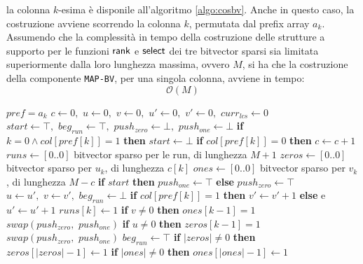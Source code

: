la colonna $k$-esima è disponile all'algoritmo \ref{algo:cosbv}. Anche in questo
caso, la costruzione avviene scorrendo la colonna $k$, permutata dal
prefix array $a_k$. \\ 
Assumendo che la complessità in tempo della costruzione delle
strutture a supporto per le funzioni $\mbox{\rm {\sf rank}}$ e $\mbox{\rm {\sf select}}$ dei tre
bitvector sparsi sia limitata superiormente dalla loro lunghezza massima, ovvero
$M$, si ha che la costruzione della componente \texttt{MAP-BV}, per una singola
colonna, avviene in tempo:
\begin{equation}
  \label{eq:bvcos}
  \mathcal{O}(M)
\end{equation}
\begin{algorithm}
  \small
  \begin{algorithmic}[1]
    \Comment $pref=a_k$
    \State $c\gets 0,\,\,u\gets 0,\,\,v\gets 0,\,\,u'\gets 0,\,\, v'\gets
    0,\,\,curr_{lcs}\gets 0$
    \State $start \gets \top,\,\,beg_{run}\gets \top,\,\,push_{zero}\gets
    \bot,\,\,push_{one}\gets \bot$
    \For {\textit{every} $k\in\left[0,\,\, M\right)$}
    \State \textbf{if} $k=0\land col[pref[k]]=1$ \textbf{then} $start \gets
    \bot$  
    \State \textbf{if} $col[pref[k]]=0$ \textbf{then}  $c\gets c+1$
    \EndFor
    \State $runs\gets[0..0]$
    \Comment bitvector sparso per le run, di lunghezza $M+1$
    \State $zeros\gets[0..0]$
    \Comment bitvector sparso per $u_k$, di lunghezza $c[k]$
    \State $ones\gets[0..0]$
    \Comment bitvector sparso per $v_k$, di lunghezza $M-c$
    \State \textbf{if} $start$ \textbf{then} $push_{one}\gets \top$
    \textbf{else} $push_{zero}\gets \top$ 
    \For {\textit{every} $k\in\left[0,\,\, M\right)$}
    \State $u\gets u',\,\,v\gets v',\,\,beg_{run}\gets \bot$
    \EndIf
    \State \textbf{if} $col[pref[k]]=1$ \textbf{then} $v'\gets v'+1$
    \textbf{else} e $u'\gets u'+1$   
    \State $runs[k]\gets 1$
    \State \textbf{if} $v\neq 0$ \textbf{then} $ones[k-1]=1$
    \State $swap(push_{zero},\,\,push_{one})$
    \Else
    \State \textbf{if} $u\neq 0$ \textbf{then} $zeros[k-1]=1$
    \State $swap(push_{zero},\,\,push_{one})$
    \EndIf
    \State $beg_{run}\gets \top$
    \EndIf
    \EndFor
    \State \textbf{if} $|zeros|\neq 0$ \textbf{then} $zeros[|zeros|-1]\gets 1$
    \State \textbf{if} $|ones|\neq 0$ \textbf{then} $ones[|ones|-1]\gets 1$
    

\end{algorithmic}
\end{algorithm}
